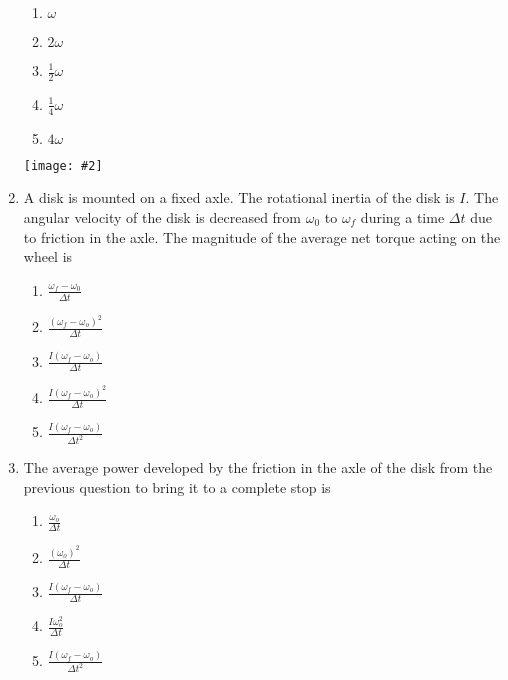 \documentclass[12pt]{article}
\newcommand{\pic}[2]{\texttt{[image: \#2]}}
\begin{document}
\begin{enumerate}[leftmargin=50pt,label=\underline{\hspace{0.4in}} \arabic*]
  \begin{minipage}{0.3\textwidth}
    \begin{enumerate}[noitemsep,topsep=0pt]
    \item $\displaystyle \omega$
    \item $\displaystyle 2\omega$
    \item $\displaystyle \frac{1}{2}\omega$
    \item $\displaystyle \frac{1}{4}\omega$
    \item $\displaystyle 4\omega$
    \end{enumerate}
  \end{minipage}
  \begin{minipage}{0.65\textwidth}
    \pic{.7}{wheels.png}
  \end{minipage}  
  \newpage

\item A disk is mounted on a fixed axle. The rotational inertia of the disk is
  $I$. The angular velocity of the disk is decreased from $\omega_0$ to
  $\omega_f$ during a time $\Delta t$ due to friction in the axle. The
  magnitude of the average net torque acting on the wheel is
  \begin{enumerate}[noitemsep,topsep=0pt]
  \item $\displaystyle\frac{\omega_f-\omega_0}{\Delta t}$
  \item $\displaystyle\frac{(\omega_f-\omega_o)^2}{\Delta t}$
  \item $\displaystyle\frac{I(\omega_f-\omega_o)}{\Delta t}$
  \item $\displaystyle\frac{I(\omega_f-\omega_o)^2}{\Delta t}$
  \item $\displaystyle\frac{I(\omega_f-\omega_o)}{\Delta t^2}$
  \end{enumerate}

\item The average power developed by the friction in the axle of the disk
  from the previous question to bring it to a complete stop is
  \begin{enumerate}[noitemsep,topsep=0pt]
  \item $\displaystyle\frac{\omega_o}{\Delta t}$
  \item $\displaystyle\frac{(\omega_o)^2}{\Delta t}$
  \item $\displaystyle\frac{I(\omega_f-\omega_o)}{\Delta t}$
  \item $\displaystyle\frac{I\omega_o^2}{\Delta t}$
  \item $\displaystyle\frac{I(\omega_f-\omega_o)}{\Delta t^2}$
  \end{enumerate}


\end{enumerate}
\end{document}
